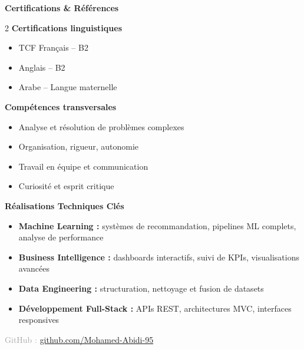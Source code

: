 \documentclass[10pt,a4paper]{article}
\newcommand{\cvsection}[1]{
    \vspace{0.3cm}
    \noindent\colorbox{sectiongray}{%
        \parbox{\dimexpr\textwidth-2\fboxsep\relax}{%
            \textcolor{mainblue}{\large\textbf{#1}}%
        }%
    }
    \vspace{0.15cm}
}
\begin{document}
\cvsection{Certifications \& Références}

\begin{multicols}{2}
\textbf{Certifications linguistiques}
\begin{itemize}
\item TCF Français – B2
\item Anglais – B2
\item Arabe – Langue maternelle
\end{itemize}

\columnbreak

\textbf{Compétences transversales}
\begin{itemize}
\item Analyse et résolution de problèmes complexes
\item Organisation, rigueur, autonomie
\item Travail en équipe et communication
\item Curiosité et esprit critique
\end{itemize}
\end{multicols}

\cvsection{Réalisations Techniques Clés}

\begin{itemize}
\item \textbf{Machine Learning :} systèmes de recommandation, pipelines ML complets, analyse de performance
\item \textbf{Business Intelligence :} dashboards interactifs, suivi de KPIs, visualisations avancées
\item \textbf{Data Engineering :} structuration, nettoyage et fusion de datasets
\item \textbf{Développement Full-Stack :} APIs REST, architectures MVC, interfaces responsives
\end{itemize}

\vspace{0.3cm}
\begin{center}
\textcolor{darkgray}{\small GitHub : \href{https://github.com/Mohamed-Abidi-95}{github.com/Mohamed-Abidi-95}}
\end{center}
\end{document}
